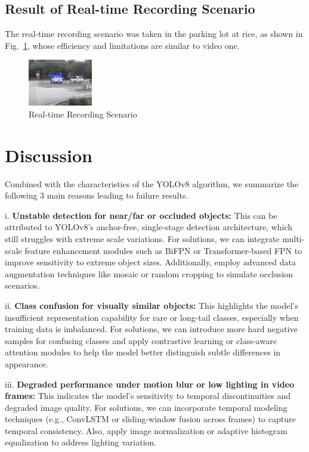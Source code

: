 \documentclass[journal,transmag]{IEEEtran}
\begin{document}
\subsection{Result of Real-time Recording Scenario}

The real-time recording scenario was taken in the parking lot at rice, as shown in Fig.~\ref{fig:Real-time Recording Scenario}, whose efficiency and limitations are similar to video one. 

\begin{figure}[h]
    \centering
    \includegraphics[width=0.25\textwidth]{Result_Real_Time_1.png}
    \caption{Real-time Recording Scenario}
    \label{fig:Real-time Recording Scenario}
\end{figure}

\section{Discussion}

Combined with the characteristics of the YOLOv8 algorithm, we summarize the following 3 main reasons leading to failure results.

i. \textbf{Unstable detection for near/far or occluded objects: } This can be attributed to YOLOv8's anchor-free, single-stage detection architecture, which still struggles with extreme scale variations. For solutions, we can integrate multi-scale feature enhancement modules such as BiFPN or Transformer-based FPN to improve sensitivity to extreme object sizes. Additionally, employ advanced data augmentation techniques like mosaic or random cropping to simulate occlusion scenarios.

ii. \textbf{Class confusion for visually similar objects: } This highlights the model’s insufficient representation capability for rare or long-tail classes, especially when training data is imbalanced. For solutions, we can introduce more hard negative samples for confusing classes and apply contrastive learning or class-aware attention modules to help the model better distinguish subtle differences in appearance.

iii. \textbf{Degraded performance under motion blur or low lighting in video frames: } This indicates the model’s sensitivity to temporal discontinuities and degraded image quality. For solutions, we can incorporate temporal modeling techniques (e.g., ConvLSTM or sliding-window fusion across frames) to capture temporal consistency. Also, apply image normalization or adaptive histogram equalization to address lighting variation.
\end{document}
